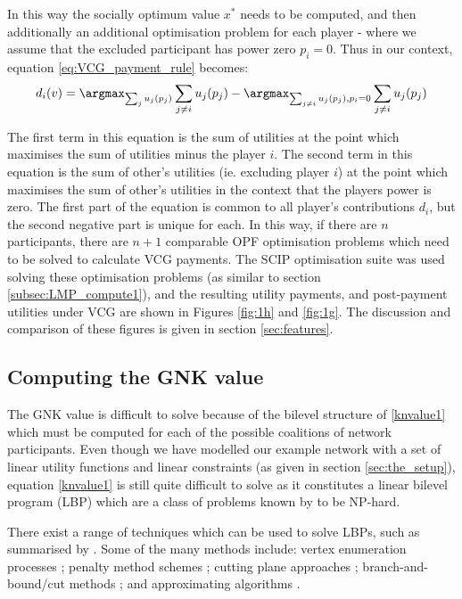 In this way the socially optimum value $x^*$ needs to be computed, and then additionally an additional optimisation problem for each player - where we assume that the excluded participant has power zero $p_i=0$. Thus in our context, equation \ref{eq:VCG_payment_rule} becomes:
\begin{equation*} d_i(v)=\argmax_{\sum_{j} u_j(p_j)}\sum_{j\ne i}u_j(p_j) - \argmax_{\sum_{j\ne i} u_j(p_j), p_i=0}\sum_{j\ne i}u_j(p_j)\end{equation*}

The first term in this equation is the sum of utilities at the point which maximises the sum of utilities minus the player $i$.
The second term in this equation is the sum of other's utilities (ie. excluding player $i$) at the point which maximises the sum of other's utilities in the context that the players power is zero.
The first part of the equation is common to all player's contributions $d_i$, but the second negative part is unique for each.
In this way, if there are $n$ participants, there are $n+1$ comparable OPF optimisation problems which need to be solved to calculate VCG payments.
The SCIP optimisation suite was used solving these optimisation problems (as similar to section \ref{subsec:LMP_compute1}), and the resulting utility payments, and post-payment utilities under VCG are shown in Figures \ref{fig:1h} and \ref{fig:1g}.
The discussion and comparison of these figures is given in section \ref{sec:features}.


\subsection{Computing the GNK value}\label{subsec:gnk_compute1}

The GNK value is difficult to solve because of the bilevel structure of \eqref{knvalue1} which must be computed for each of the possible coalitions of network participants.
Even though we have modelled our example network with a set of linear utility functions and linear constraints (as given in section \ref{sec:the_setup}), equation \eqref{knvalue1} is still quite difficult to solve as it constitutes a linear bilevel program (LBP) which are a class of problems known by to be NP-hard. \citep{DBLP:journals/tec/SinhaMD18,Ben-Ayed:1990:CDB} 

There exist a range of techniques which can be used to solve LBPs, such as summarised by \cite{DBLP:journals/tec/SinhaMD18,S.Dempe.Optimisations}.
Some of the many methods include: vertex enumeration processes \citep{Bialas:1984:TLP:2784019.2784026,Shi:2005:EKA:2641854.2642183,LIU1995644}; penalty method schemes \citep{KleinertSchmidt2019,ONAL1993126,dempe_optimisation111};
cutting plane approaches \citep{cuttingplane1};
branch-and-bound/cut methods \citep{SHI200551,Hansen:1992:NBR:141164.141181,Audet2007};
and approximating algorithms \citep{Pineda2018,rnnlbp1,genetic_algirthm_blp}.


